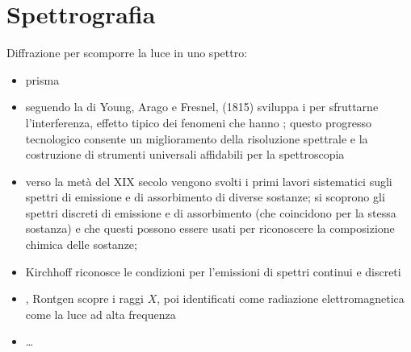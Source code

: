 \documentclass[letterpaper,10pt,italian]{jupyterBook}
\begin{document}
\section{Spettrografia}
\label{\detokenize{ch/electromagnetism/em-waves:spettrografia}}\label{\detokenize{ch/electromagnetism/em-waves:physics-hs-electromagnetism-em-waves-spectrography}}
\sphinxAtStartPar
Diffrazione per scomporre la luce in uno spettro:
\begin{itemize}
\item {} 
\sphinxAtStartPar
prisma

\item {} 
\sphinxAtStartPar
seguendo la  di Young, Arago e Fresnel,  (1815) sviluppa i  {\hyperref[\detokenize{ch/waves/phenomena:physics-hs-waves-effects-diffraction}]{}} per sfruttarne l’interferenza, effetto tipico dei fenomeni che hanno ; questo progresso tecnologico consente un miglioramento della risoluzione spettrale e la costruzione di strumenti universali affidabili per la spettroscopia

\item {} 
\sphinxAtStartPar
verso la metà del XIX secolo vengono svolti i primi lavori sistematici sugli spettri di emissione e di assorbimento di diverse sostanze; si scoprono gli spettri discreti di emissione e di assorbimento (che coincidono per la stessa sostanza) e che questi possono essere usati per riconoscere la composizione chimica delle sostanze;

\item {} 
\sphinxAtStartPar
Kirchhoff riconosce le condizioni per l’emissioni di spettri continui e discreti

\item {} 
, Rontgen scopre i raggi \(X\), poi identificati come radiazione elettromagnetica \sphinxhyphen{} come la luce \sphinxhyphen{} ad alta frequenza

\item {} 
\sphinxAtStartPar
…

\end{itemize}

\sphinxAtStartPar
{}  
\end{document}
